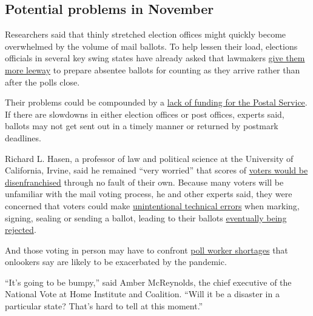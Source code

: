 \hypertarget{potential-problems-in-november}{%
\subsection{Potential problems in
November}\label{potential-problems-in-november}}

Researchers said that thinly stretched election offices might quickly
become overwhelmed by the volume of mail ballots. To help lessen their
load, elections officials in several key swing states have already asked
that lawmakers
\href{https://www.mlive.com/public-interest/2020/07/how-absentee-ballots-are-deepening-the-divide-between-michigan-democrats-and-republicans.html}{give
them more leeway} to prepare absentee ballots for counting as they
arrive rather than after the polls close.

Their problems could be compounded by a
\href{https://www.nytimes3xbfgragh.onion/2020/05/10/us/politics/postal-service-trump-coronavirus.html}{lack
of funding for the Postal Service}. If there are slowdowns in either
election offices or post offices, experts said, ballots may not get sent
out in a timely manner or returned by postmark deadlines.

Richard L. Hasen, a professor of law and political science at the
University of California, Irvine, said he remained ``very worried'' that
scores of
\href{https://www.nytimes3xbfgragh.onion/2020/08/03/nyregion/nyc-congress-carolyn-maloney-ballots.html}{voters
would be disenfranchised} through no fault of their own. Because many
voters will be unfamiliar with the mail voting process, he and other
experts said, they were concerned that voters could make
\href{https://www.nytimes3xbfgragh.onion/2020/07/17/nyregion/election-absentee-ballots-primary.html}{unintentional
technical errors} when marking, signing, sealing or sending a ballot,
leading to their ballots
\href{https://www.nytimes3xbfgragh.onion/2020/08/03/nyregion/nyc-mail-ballots-voting.html}{eventually
being rejected}.

And those voting in person may have to confront
\href{https://www.nytimes3xbfgragh.onion/2018/09/06/nyregion/the-path-to-becoming-an-underpaid-underappreciated-and-absolutely-necessary-election-poll-worker.html}{poll
worker shortages} that onlookers say are likely to be exacerbated by the
pandemic.

``It's going to be bumpy,'' said Amber McReynolds, the chief executive
of the National Vote at Home Institute and Coalition. ``Will it be a
disaster in a particular state? That's hard to tell at this moment.''

